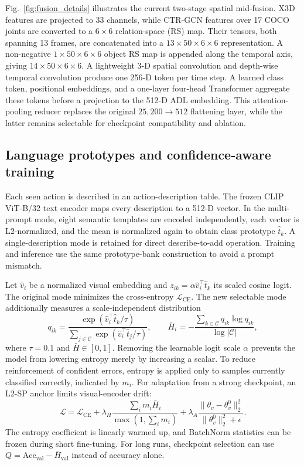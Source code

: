 \documentclass[conference]{IEEEtran}
\begin{document}
Fig.~\ref{fig:fusion_details} illustrates the current two-stage spatial
mid-fusion. X3D features are projected to 33 channels, while CTR-GCN features
over 17 COCO joints are converted to a $6\times6$ relation-space (RS) map.
Their tensors, both spanning 13 frames, are concatenated into a
$13\times50\times6\times6$ representation. A non-negative
$1\times50\times6\times6$ object RS map is appended along the temporal axis,
giving $14\times50\times6\times6$. A lightweight 3-D spatial convolution and
depth-wise temporal convolution produce one 256-D token per time step. A
learned class token, positional embeddings, and a one-layer four-head
Transformer aggregate these tokens before a projection to the 512-D ADL
embedding. This attention-pooling reducer replaces the original
$25{,}200\rightarrow512$ flattening layer, while the latter remains selectable
for checkpoint compatibility and ablation.

\subsection{Language prototypes and confidence-aware training}
Each seen action is described in an action-description table. The frozen CLIP
ViT-B/32 text encoder maps every description to a 512-D vector. In the
multi-prompt mode, eight semantic templates are encoded independently, each
vector is L2-normalized, and the mean is normalized again to obtain class
prototype $\hat{t}_k$. A single-description mode is retained for direct
describe-to-add operation. Training and inference use the same prototype-bank
construction to avoid a prompt mismatch.

Let $\hat{v}_i$ be a normalized visual embedding and
$z_{ik}=\alpha\hat{v}_i^{\top}\hat{t}_k$ its scaled cosine logit. The original
mode minimizes the cross-entropy $\mathcal{L}_{\mathrm{CE}}$. The new selectable
mode additionally measures a scale-independent distribution
\begin{equation}
q_{ik}=\frac{\exp(\hat{v}_i^{\top}\hat{t}_k/\tau)}
{\sum_{j\in\mathcal{C}}\exp(\hat{v}_i^{\top}\hat{t}_j/\tau)},\qquad
\bar{H}_i=-\frac{\sum_{k\in\mathcal{C}}q_{ik}\log q_{ik}}{\log|\mathcal{C}|},
\end{equation}
where $\tau=0.1$ and $\bar{H}\in[0,1]$. Removing the learnable logit scale
$\alpha$ prevents the model from lowering entropy merely by increasing a
scalar. To reduce reinforcement of confident errors, entropy is applied only
to samples currently classified correctly, indicated by $m_i$. For adaptation
from a strong checkpoint, an L2-SP anchor limits visual-encoder drift:
\begin{equation}
\mathcal{L}=\mathcal{L}_{\mathrm{CE}}+
\lambda_H\frac{\sum_i m_i\bar{H}_i}{\max(1,\sum_i m_i)}+
\lambda_A\frac{\|\theta_v-\theta_v^0\|_2^2}
{\|\theta_v^0\|_2^2+\epsilon}.
\end{equation}
The entropy coefficient is linearly warmed up, and BatchNorm statistics can be
frozen during short fine-tuning. For long runs, checkpoint selection can use
$Q=\mathrm{Acc}_{\mathrm{val}}-\bar{H}_{\mathrm{val}}$ instead of accuracy alone.
\end{document}
